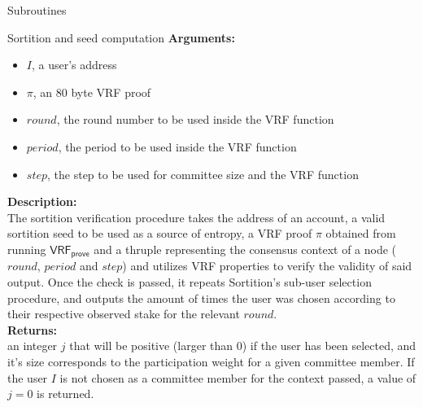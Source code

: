 \documentclass[10pt,a4paper]{article}
\begin{document}
\begin{section}{Subroutines}
\begin{subsection}{Sortition and seed computation}
\noindent \textbf{Arguments:}
\begin{itemize}
    \item $I$, a user's address
    \item $\pi$, an 80 byte VRF proof
    \item $round$, the round number to be used inside the VRF function
    \item $period$, the period to be used inside the VRF function
    \item $step$, the step to be used for committee size and the VRF function
  \end{itemize}

\noindent \textbf{Description:}\\
The sortition verification procedure takes the address of an account,
a valid sortition seed to be used as a source of entropy,
a VRF proof $\pi$ obtained from running $\mathsf{VRF_{prove}}$ and 
a thruple representing the consensus context of a node ($round$, $period$ and $step$) and utilizes 
VRF properties to verify the validity of said output.
Once the check is passed, it repeats Sortition's sub-user selection procedure, 
and outputs the amount of times the user was chosen according to their respective 
observed stake for the relevant $round$.\\

\noindent \textbf{Returns:} \\
an integer $j$ that will be positive (larger than 0) if the user has been 
    selected, and it's size corresponds to the participation weight for a given committee member.
    If the user $I$ is not chosen as a committee member for the context passed, 
    a value of $j = 0$ is returned.

\end{subsection}


\end{section}
\end{document}
